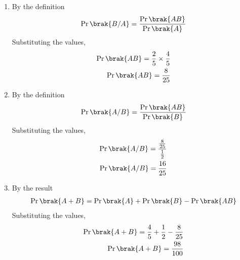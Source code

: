  \begin{enumerate}
\item By the definition
\begin{align}
\Pr\brak{B/A} = \frac{\Pr\brak{AB}}{\Pr\brak{A}}
\end{align}
Substituting the values,
\begin{align}
\Pr\brak{AB} = \frac{2}{5} \times \frac{4}{5}\\
\Pr\brak{AB} = \frac{8}{25}
\end{align}
\item By the definition
\begin{align}
\Pr\brak{A/B} = \frac{\Pr\brak{AB}}{\Pr\brak{B}}
\end{align}
Substituting the values,
\begin{align}
\Pr\brak{A/B} = \frac {\frac{8}{25}} {\frac{1}{2}}\\
\Pr\brak{A/B} = \frac{16}{25}
\end{align}
\item By the result
\begin{align}
\Pr\brak{A+B} = \Pr\brak{A} + \Pr\brak{B} - \Pr\brak{AB}
\end{align}
Substituting the values,
\begin{align}
\Pr\brak{A+B} = \frac{4}{5} + \frac{1}{2} - \frac{8}{25}\\
\Pr\brak{A+B} = \frac{98}{100}
\end{align}
\end{enumerate}